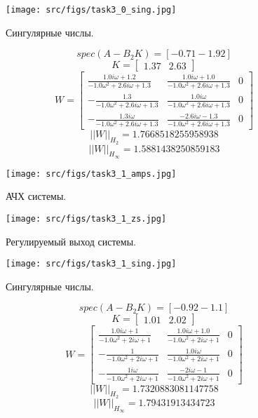   \begin{figure}[ht!]
    \centering
    \texttt{[image: src/figs/task3\_0\_sing.jpg]}
    \caption{Сингулярные числы.}
    \label{fig:task3_0_sing}
  \end{figure}

\FloatBarrier

\[spec(A-B_2 K) = [-0.71 -1.92]\]
\[K = \begin{bmatrix}
  1.37 &  2.63
\end{bmatrix}\]
\[ W = \left[\begin{matrix}\frac{1.0 i \omega + 1.2}{- 1.0 \omega^{2} + 2.6 i \omega + 1.3} & \frac{1.0 i \omega + 1.0}{- 1.0 \omega^{2} + 2.6 i \omega + 1.3} & 0\\- \frac{1.3}{- 1.0 \omega^{2} + 2.6 i \omega + 1.3} & \frac{1.0 i \omega}{- 1.0 \omega^{2} + 2.6 i \omega + 1.3} & 0\\- \frac{1.3 i \omega}{- 1.0 \omega^{2} + 2.6 i \omega + 1.3} & \frac{- 2.6 i \omega - 1.3}{- 1.0 \omega^{2} + 2.6 i \omega + 1.3} & 0\end{matrix}\right]\]
\[||W||_{H_2} = 1.7668518255958938\]
\[||W||_{H_\infty} = 1.5881438250859183 \]

\begin{figure}[ht!]
    \centering
    \texttt{[image: src/figs/task3\_1\_amps.jpg]}
    \caption{АЧХ системы.}
    \label{fig:task3_1_amps}
  \end{figure}
  
  \begin{figure}[ht!]
    \centering
    \texttt{[image: src/figs/task3\_1\_zs.jpg]}
    \caption{Регулируемый выход системы.}
    \label{fig:task3_1_zs}
  \end{figure}
  
  \begin{figure}[ht!]
    \centering
    \texttt{[image: src/figs/task3\_1\_sing.jpg]}
    \caption{Сингулярные числы.}
    \label{fig:task3_1_sing}
  \end{figure}

\FloatBarrier

\[spec(A-B_2 K) = [-0.92 -1.1 ]\]
\[K = \begin{bmatrix}
  1.01 &  2.02
\end{bmatrix}\]
\[W = \left[\begin{matrix}\frac{1.0 i \omega + 1}{- 1.0 \omega^{2} + 2 i \omega + 1} & \frac{1.0 i \omega + 1.0}{- 1.0 \omega^{2} + 2 i \omega + 1} & 0\\- \frac{1}{- 1.0 \omega^{2} + 2 i \omega + 1} & \frac{1.0 i \omega}{- 1.0 \omega^{2} + 2 i \omega + 1} & 0\\- \frac{1 i \omega}{- 1.0 \omega^{2} + 2 i \omega + 1} & \frac{- 2 i \omega - 1}{- 1.0 \omega^{2} + 2 i \omega + 1} & 0\end{matrix}\right]\]
\[||W||_{H_2} = 1.7320883081147758\]
\[||W||_{H_\infty} = 1.79431913434723 \]

